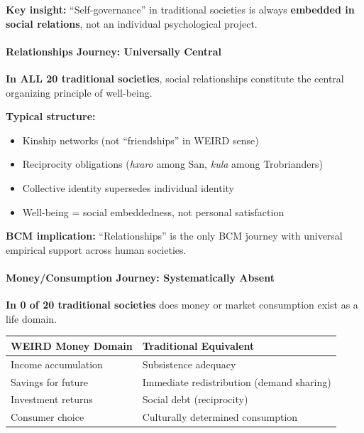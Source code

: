 \textbf{Key insight:} ``Self-governance'' in traditional societies is always \textbf{embedded in social relations}, not an individual psychological project.

\paragraph{Relationships Journey: Universally Central}

\begin{tcolorbox}[colback=green!5!white, colframe=green!75!black, title=Finding: Relationships = Core Domain (20/20)]
\textbf{In ALL 20 traditional societies}, social relationships constitute the central organizing principle of well-being.

\textbf{Typical structure:}
\begin{itemize}[nosep]
\item Kinship networks (not ``friendships'' in WEIRD sense)
\item Reciprocity obligations (\textit{hxaro} among San, \textit{kula} among Trobrianders)
\item Collective identity supersedes individual identity
\item Well-being = social embeddedness, not personal satisfaction
\end{itemize}

\textbf{BCM implication:} ``Relationships'' is the only BCM journey with universal empirical support across human societies.
\end{tcolorbox}

\paragraph{Money/Consumption Journey: Systematically Absent}

\textbf{In 0 of 20 traditional societies} does money or market consumption exist as a life domain.

\begin{center}
\begin{tabular}{@{}lp{6cm}@{}}
\toprule
\textbf{WEIRD Money Domain} & \textbf{Traditional Equivalent} \\
\midrule
Income accumulation & Subsistence adequacy \\
Savings for future & Immediate redistribution (demand sharing) \\
Investment returns & Social debt (reciprocity) \\
Consumer choice & Culturally determined consumption \\
\bottomrule
\end{tabular}
\end{center}

